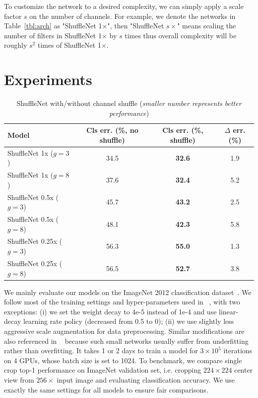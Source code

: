 \documentclass[10pt,twocolumn,letterpaper]{article}
\begin{document}
To customize the network to a desired complexity, we can simply apply a scale factor $s$ on the number of channels. For example, we denote the networks in Table~\ref{tbl:arch} as "ShuffleNet 1$\times$", then "ShuffleNet $s\times$" means scaling the number of filters in ShuffleNet 1$\times$ by $s$ times thus overall complexity will be roughly $s^2$ times of ShuffleNet 1$\times$. 

\section{Experiments}
\label{sec:exp}

\begin{table}[ht]
	\begin{center}
		\begin{tabular}{l|c|c|c}
			\hline
			Model & Cls err. (\%, no shuffle) & Cls err. (\%, shuffle) & $\Delta$ err. (\%) \\
			\hline \hline
			ShuffleNet 1x ($g=3$) & 34.5 & \textbf{32.6} & 1.9 \\
			ShuffleNet 1x ($g=8$) & 37.6 & \textbf{32.4} & 5.2 \\
			\hline
			ShuffleNet 0.5x ($g=3$) & 45.7 & \textbf{43.2} & 2.5 \\
			ShuffleNet 0.5x ($g=8$) & 48.1 & \textbf{42.3} & 5.8 \\
			\hline
			ShuffleNet 0.25x ($g=3$) & 56.3 & \textbf{55.0} & 1.3 \\
			ShuffleNet 0.25x ($g=8$) & 56.5 & \textbf{52.7} & 3.8 \\
			\hline
		\end{tabular}
	\end{center}
	\caption{ShuffleNet with/without channel shuffle (\emph{smaller number represents better performance})}
	\label{tbl:shuffle}
\end{table}



We mainly evaluate our models on the ImageNet 2012 classification dataset~\cite{russakovsky2015imagenet,deng2009imagenet}. We follow most of the training settings and hyper-parameters used in ~\cite{xie2016aggregated}, with two exceptions: (i) we set the weight decay to 4e-5 instead of 1e-4 and use linear-decay learning rate policy (decreased from 0.5 to 0); (ii) we use slightly less aggressive scale augmentation for data preprocessing. Similar modifications are also referenced in ~\cite{howard2017mobilenets} because such small networks usually suffer from underfitting rather than overfitting. It takes 1 or 2 days to train a model for $3\times 10^5$ iterations on 4 GPUs, whose batch size is set to 1024. To benchmark, we compare single crop top-1 performance on ImageNet validation set, i.e. cropping $224\times 224$ center view from $256\times$ input image and evaluating classification accuracy. We use exactly the same settings for all models to ensure fair comparisons.
\end{document}
